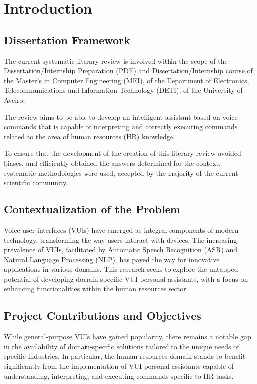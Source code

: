 \chapter{Introduction}\label{chapter:introduction}

\section{Dissertation Framework}

The current systematic literary review is involved within the scope of the Dissertation/Internship Preparation (PDE) and Dissertation/Internship course of the Master's in Computer Engineering (MEI), of the Department of Electronics, Telecommunications and Information Technology (DETI), of the University of Aveiro.

The review aims to be able to develop an intelligent assistant based on voice commands that is capable of interpreting and correctly executing commands related to the area of human resources (HR) knowledge.

To ensure that the development of the creation of this literary review avoided biases, and efficiently obtained the answers determined for the context, systematic methodologies were used, accepted by the majority of the current scientific community.

\section{Contextualization of the Problem}


Voice-user interfaces (VUIs) have emerged as integral components of modern technology, transforming the way users interact with devices. The increasing prevalence of VUIs, facilitated by Automatic Speech Recognition (ASR) and Natural Language Processing (NLP), has paved the way for innovative applications in various domains. This research seeks to explore the untapped potential of developing domain-specific VUI personal assistants, with a focus on enhancing functionalities within the human resources sector.

\section{Project Contributions and Objectives}


While general-purpose VUIs have gained popularity, there remains a notable gap in the availability of domain-specific solutions tailored to the unique needs of specific industries. In particular, the human resources domain stands to benefit significantly from the implementation of VUI personal assistants capable of understanding, interpreting, and executing commands specific to HR tasks.

